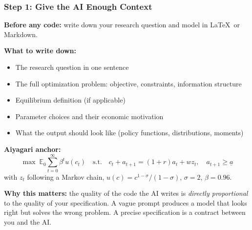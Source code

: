 \documentclass[10pt,english,aspectratio=169]{beamer}
\begin{document}
\begin{frame}
\frametitle{Step 1: Give the AI Enough Context}

\textbf{Before any code:} write down your research question and model in \LaTeX\ or Markdown.

\vspace{0.2cm}

\textbf{What to write down:}
\begin{itemize}
    \item The research question in one sentence
    \item The full optimization problem: objective, constraints, information structure
    \item Equilibrium definition (if applicable)
    \item Parameter choices and their economic motivation
    \item What the output should look like (policy functions, distributions, moments)
\end{itemize}

\vspace{0.2cm}

\textbf{Aiyagari anchor:}
\[
\max \;\mathbb{E}_0 \sum_{t=0}^{\infty} \beta^t u(c_t) \quad \text{s.t.} \quad c_t + a_{t+1} = (1+r)a_t + w z_t, \quad a_{t+1} \geq \underline{a}
\]
with $z_t$ following a Markov chain, $u(c) = c^{1-\sigma}/(1-\sigma)$, $\sigma=2$, $\beta=0.96$.

\vspace{0.2cm}

\textbf{Why this matters:} the quality of the code the AI writes is \textit{directly proportional} to the quality of your specification. A vague prompt produces a model that looks right but solves the wrong problem. A precise specification is a contract between you and the AI.
\end{frame}
\end{document}
